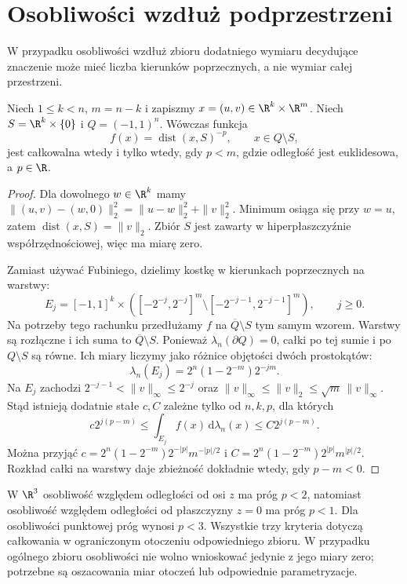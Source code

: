 \section{Osobliwości wzdłuż podprzestrzeni}

W przypadku osobliwości wzdłuż zbioru
dodatniego wymiaru decydujące znaczenie
może mieć liczba kierunków poprzecznych,
a nie wymiar całej przestrzeni.

\begin{twierdzenie}
\label{ma2:thm:improper-transverse}
Niech $1\le k<n$, $m=n-k$ i zapiszmy
$x=(u,v)\in\R^k\times\R^m$.
Niech $S=\R^k\times\{0\}$ i
$Q=(-1,1)^n$. Wówczas funkcja
\[
 f(x)=\operatorname{dist}(x,S)^{-p},
 \qquad x\in Q\setminus S,
\]
jest całkowalna wtedy i tylko wtedy, gdy $p<m$,
gdzie odległość jest euklidesowa, a $p\in\R$.
\end{twierdzenie}
\begin{proof}
Dla dowolnego $w\in\R^k$ mamy
$\|(u,v)-(w,0)\|_2^2=\|u-w\|_2^2+\|v\|_2^2$.
Minimum osiąga się przy $w=u$, zatem
$\operatorname{dist}(x,S)=\|v\|_2$.
Zbiór $S$ jest zawarty w hiperpłaszczyźnie
współrzędnościowej, więc ma miarę zero.

Zamiast używać Fubiniego, dzielimy kostkę
w kierunkach poprzecznych na warstwy:
\[
 E_j=[-1,1]^k\times
 ([-2^{-j},2^{-j}]^m\setminus
 [-2^{-j-1},2^{-j-1}]^m),\qquad j\ge0.
\]
Na potrzeby tego rachunku przedłużamy $f$ na
$\overline Q\setminus S$ tym samym wzorem.
Warstwy są rozłączne i ich suma to
$\overline Q\setminus S$. Ponieważ
$\lambda_n(\partial Q)=0$, całki po tej sumie
i po $Q\setminus S$ są równe.
Ich miary liczymy jako różnice objętości
dwóch prostokątów:
\[
 \lambda_n(E_j)=2^n(1-2^{-m})2^{-jm}.
\]
Na $E_j$ zachodzi
$2^{-j-1}<\|v\|_\infty\le2^{-j}$
oraz $\|v\|_\infty\le\|v\|_2
\le\sqrt m\,\|v\|_\infty$.
Stąd istnieją dodatnie stałe $c,C$
zależne tylko od $n,k,p$, dla których
\[
 c2^{j(p-m)}
 \le\int_{E_j}f(x)\,\mathrm d\lambda_n(x)
 \le C2^{j(p-m)}.
\]
Można przyjąć
$c=2^n(1-2^{-m})2^{-|p|}m^{-|p|/2}$
i $C=2^n(1-2^{-m})2^{|p|}m^{|p|/2}$.
Rozkład całki na warstwy daje zbieżność
dokładnie wtedy, gdy $p-m<0$.
\end{proof}

\begin{przyklad}
\label{ma2:ex:improper-transverse}
W $\R^3$ osobliwość względem odległości
od osi $z$ ma próg $p<2$, natomiast
osobliwość względem odległości od
płaszczyzny $z=0$ ma próg $p<1$.
Dla osobliwości punktowej próg wynosi $p<3$.
Wszystkie trzy kryteria dotyczą całkowania
w ograniczonym otoczeniu odpowiedniego zbioru.
W przypadku ogólnego zbioru osobliwości
nie wolno wnioskować jedynie z jego
miary zero; potrzebne są oszacowania miar
otoczeń lub odpowiednie parametryzacje.
\end{przyklad}

